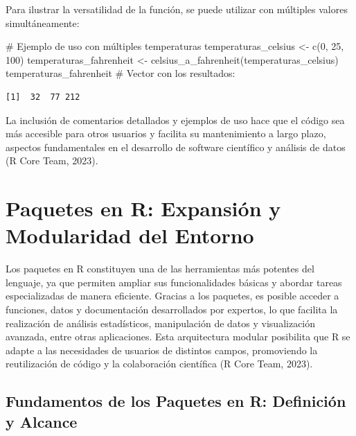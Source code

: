 \documentclass[
  spanish,
  a4paper,
  DIV=11,
  numbers=noendperiod,
  onepage,
  openany]{scrreprt}
\newenvironment{Shaded}{\begin{snugshade}}{\end{snugshade}}
\newcommand{\CommentTok}[1]{\textcolor[rgb]{0.37,0.37,0.37}{#1}}
\newcommand{\DecValTok}[1]{\textcolor[rgb]{0.68,0.00,0.00}{#1}}
\newcommand{\FunctionTok}[1]{\textcolor[rgb]{0.28,0.35,0.67}{#1}}
\newcommand{\NormalTok}[1]{\textcolor[rgb]{0.00,0.23,0.31}{#1}}
\newcommand{\OtherTok}[1]{\textcolor[rgb]{0.00,0.23,0.31}{#1}}
\begin{document}
Para ilustrar la versatilidad de la función, se puede utilizar con
múltiples valores simultáneamente:

\begin{Shaded}
\begin{Highlighting}[]
\CommentTok{\# Ejemplo de uso con múltiples temperaturas}
\NormalTok{temperaturas\_celsius }\OtherTok{\textless{}{-}} \FunctionTok{c}\NormalTok{(}\DecValTok{0}\NormalTok{, }\DecValTok{25}\NormalTok{, }\DecValTok{100}\NormalTok{)}
\NormalTok{temperaturas\_fahrenheit }\OtherTok{\textless{}{-}} \FunctionTok{celsius\_a\_fahrenheit}\NormalTok{(temperaturas\_celsius)}
\NormalTok{temperaturas\_fahrenheit }\CommentTok{\# Vector con los resultados:}
\end{Highlighting}
\end{Shaded}

\begin{verbatim}
[1]  32  77 212
\end{verbatim}

La inclusión de comentarios detallados y ejemplos de uso hace que el
código sea más accesible para otros usuarios y facilita su mantenimiento
a largo plazo, aspectos fundamentales en el desarrollo de software
científico y análisis de datos (R Core Team, 2023).


\chapter{Paquetes en R: Expansión y Modularidad del
Entorno}\label{paquetes-en-r-expansiuxf3n-y-modularidad-del-entorno}

Los paquetes en R constituyen una de las herramientas más potentes del
lenguaje, ya que permiten ampliar sus funcionalidades básicas y abordar
tareas especializadas de manera eficiente. Gracias a los paquetes, es
posible acceder a funciones, datos y documentación desarrollados por
expertos, lo que facilita la realización de análisis estadísticos,
manipulación de datos y visualización avanzada, entre otras
aplicaciones. Esta arquitectura modular posibilita que R se adapte a las
necesidades de usuarios de distintos campos, promoviendo la
reutilización de código y la colaboración científica (R Core Team,
2023).

\section{Fundamentos de los Paquetes en R: Definición y
Alcance}\label{fundamentos-de-los-paquetes-en-r-definiciuxf3n-y-alcance}
\end{document}
